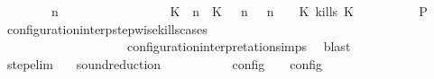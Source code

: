 \begin{isabellebody}
\ \ \ \ \ \ \ {\isacartoucheopen}{\isacharparenleft}{\isasymGamma}\ n\ {\isasymturnstile}\ {\isasymPsi}\ {\isasymtriangleright}\ {\isasymPhi}\ {\isacharequal}\isanewline
\ \ \ \ \ \ \ \ \ \ \ \ {\isacharparenleft}{\isacharparenleft}{\isacharparenleft}K\ {\isasymUp}\ n{\isacharparenright}\ {\isacharhash}\ {\isacharparenleft}K\ {\isasymnot}{\isasymUp}\ {\isasymge}\ n{\isacharparenright}\ {\isacharhash}\ {\isasymGamma}{\isacharparenright}{\isacharcomma}\ n\ {\isasymturnstile}\ {\isasymPsi}\ {\isasymtriangleright}\ {\isacharparenleft}{\isacharparenleft}K\ kills\ K\ {\isacharhash}\ {\isasymPhi}{\isacharparenright}{\isacharparenright}{\isacartoucheclose}\isanewline
\ \ \ \ \ \ \isamarkupfalse%
\ {\isacharquery}P\ \isamarkupfalse%
\ configuration{\isacharunderscore}interp{\isacharunderscore}stepwise{\isacharunderscore}kills{\isacharunderscore}cases\isanewline
\ \ \ \ \ \ \ \ \ \ \ \ \ \ \ \ \ \ \ \ configuration{\isacharunderscore}interpretation{\isachardot}simps\ \isamarkupfalse%
\ blast\isanewline
\ \ \ \ \isamarkupfalse%
\isanewline
\ \ \isamarkupfalse%
\isanewline
{}\isamarkupfalse%
%
\endisatagproof
{\isafoldproof}%
%
\isadelimproof
\isanewline
%
\endisadelimproof
\isanewline
{}\isamarkupfalse%
\ step{\isacharunderscore}elim{\isacharcolon}{\isacartoucheopen}{\isasymS}\ {\isasymhookrightarrow}\ {\isasymS}\isanewline
\isanewline
{}\isamarkupfalse%
\ sound{\isacharunderscore}reduction{\isacharprime}{\isacharcolon}\isanewline
\ \ \ {\isacartoucheopen}{\isasymS}\ {\isasymhookrightarrow}\ {\isasymS}\isanewline
\ \ \ {\isacartoucheopen}{\isasymlbrakk}\ {\isasymS}\ {\isasymrbrakk}\isactrlsub c\isactrlsub o\isactrlsub n\isactrlsub f\isactrlsub i\isactrlsub g\ {\isasymsupseteq}\ {\isasymlbrakk}\ {\isasymS}\ {\isasymrbrakk}\isactrlsub c\isactrlsub o\isactrlsub n\isactrlsub f\isactrlsub i\isactrlsub g{\isacartoucheclose}\isanewline
%
\isadelimproof
%
\endisadelimproof
%
\isatagproof
{}\isamarkupfalse%

\end{isabellebody}
